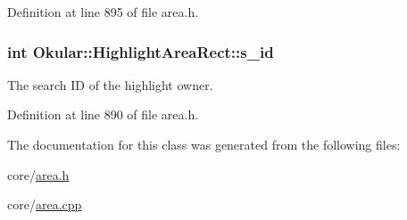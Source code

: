 Definition at line 895 of file area.\+h.

\hypertarget{classOkular_1_1HighlightAreaRect_a12c64abbc01a387e78337732f369f413}{
\subsubsection[{s\+\_\+id}]{\setlength{\rightskip}{0pt plus 5cm}int Okular\+::\+Highlight\+Area\+Rect\+::s\+\_\+id}}\label{classOkular_1_1HighlightAreaRect_a12c64abbc01a387e78337732f369f413}
The search I\+D of the highlight owner. 

Definition at line 890 of file area.\+h.



The documentation for this class was generated from the following files\+:\begin{DoxyCompactItemize}
\item 
core/\hyperlink{area_8h}{area.\+h}\item 
core/\hyperlink{area_8cpp}{area.\+cpp}\end{DoxyCompactItemize}
